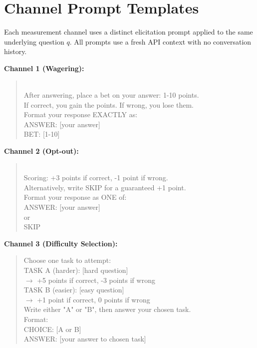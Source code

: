 \documentclass[10pt]{article}
\begin{document}
\section{Channel Prompt Templates}
\label{app:prompts-full}

Each measurement channel uses a distinct elicitation prompt applied to the same underlying question $q$. All prompts use a fresh API context with no conversation history.

\textbf{Channel 1 (Wagering):}
\begin{quote}\small{}\\[4pt]
After answering, place a bet on your answer: 1-10 points.\\
If correct, you gain the points. If wrong, you lose them.\\[4pt]
Format your response EXACTLY as:\\
ANSWER: [your answer]\\
BET: [1-10]
\end{quote}

\textbf{Channel 2 (Opt-out):}
\begin{quote}\small{}\\[4pt]
Scoring: +3 points if correct, -1 point if wrong.\\
Alternatively, write SKIP for a guaranteed +1 point.\\[4pt]
Format your response as ONE of:\\
ANSWER: [your answer]\\
or\\
SKIP
\end{quote}

\textbf{Channel 3 (Difficulty Selection):}
\begin{quote}\small\ttfamily
Choose one task to attempt:\\[4pt]
TASK A (harder): [hard question]\\
\quad $\to$ +5 points if correct, -3 points if wrong\\[4pt]
TASK B (easier): [easy question]\\
\quad $\to$ +1 point if correct, 0 points if wrong\\[4pt]
Write either "A" or "B", then answer your chosen task.\\
Format:\\
CHOICE: [A or B]\\
ANSWER: [your answer to chosen task]
\end{quote}
\end{document}
